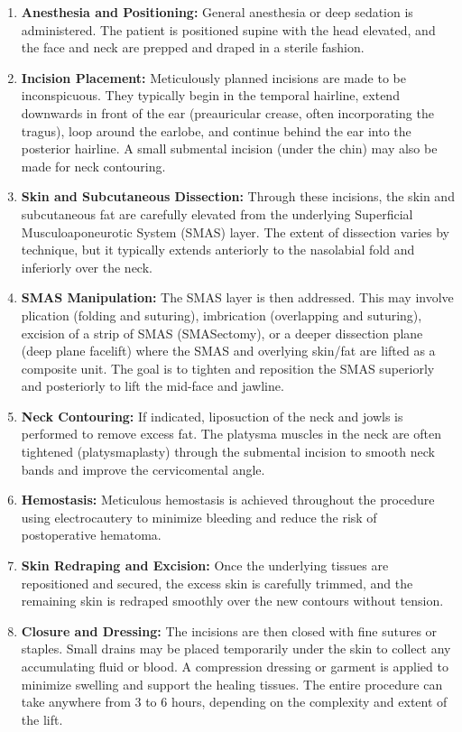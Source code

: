 \begin{enumerate}
  \item \textbf{Anesthesia and Positioning:} General anesthesia or deep sedation is administered. The patient is positioned supine with the head elevated, and the face and neck are prepped and draped in a sterile fashion.
  \item \textbf{Incision Placement:} Meticulously planned incisions are made to be inconspicuous. They typically begin in the temporal hairline, extend downwards in front of the ear (preauricular crease, often incorporating the tragus), loop around the earlobe, and continue behind the ear into the posterior hairline. A small submental incision (under the chin) may also be made for neck contouring.
  \item \textbf{Skin and Subcutaneous Dissection:} Through these incisions, the skin and subcutaneous fat are carefully elevated from the underlying Superficial Musculoaponeurotic System (SMAS) layer. The extent of dissection varies by technique, but it typically extends anteriorly to the nasolabial fold and inferiorly over the neck.
  \item \textbf{SMAS Manipulation:} The SMAS layer is then addressed. This may involve plication (folding and suturing), imbrication (overlapping and suturing), excision of a strip of SMAS (SMASectomy), or a deeper dissection plane (deep plane facelift) where the SMAS and overlying skin/fat are lifted as a composite unit. The goal is to tighten and reposition the SMAS superiorly and posteriorly to lift the mid-face and jawline.
  \item \textbf{Neck Contouring:} If indicated, liposuction of the neck and jowls is performed to remove excess fat. The platysma muscles in the neck are often tightened (platysmaplasty) through the submental incision to smooth neck bands and improve the cervicomental angle.
  \item \textbf{Hemostasis:} Meticulous hemostasis is achieved throughout the procedure using electrocautery to minimize bleeding and reduce the risk of postoperative hematoma.
  \item \textbf{Skin Redraping and Excision:} Once the underlying tissues are repositioned and secured, the excess skin is carefully trimmed, and the remaining skin is redraped smoothly over the new contours without tension.
  \item \textbf{Closure and Dressing:} The incisions are then closed with fine sutures or staples. Small drains may be placed temporarily under the skin to collect any accumulating fluid or blood. A compression dressing or garment is applied to minimize swelling and support the healing tissues. The entire procedure can take anywhere from 3 to 6 hours, depending on the complexity and extent of the lift.
\end{enumerate}

